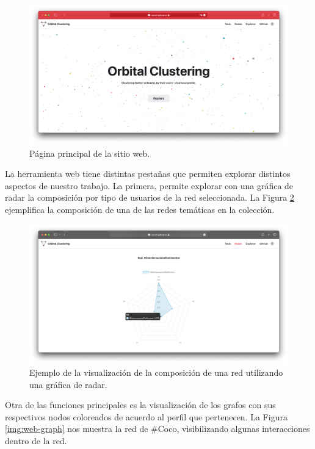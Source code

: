  \begin{figure}
   \centering
   \includegraphics[width=1\textwidth]{images/web-main.png}
    \caption{Página principal de la sitio web.}
    \label{img:web-main}
\end{figure}

La herramienta web tiene distintas pestañas que permiten explorar distintos aspectos de nuestro trabajo. La primera, permite explorar con una gráfica de radar la composición por tipo de usuarios de la red seleccionada. La Figura \ref{img:web-comp} ejemplifica la composición de una de las redes temáticas en la colección.

 \begin{figure}
   \centering
   \includegraphics[width=1\textwidth]{images/web-comp.png}
    \caption{Ejemplo de la visualización de la composición de una red utilizando una gráfica de radar.}
    \label{img:web-comp}
\end{figure}

Otra de las funciones principales es la visualización de los grafos con sus respectivos nodos coloreados de acuerdo al perfil que pertenecen. La Figura \ref{img:web-graph} nos muestra la red de \#Coco, visibilizando algunas interacciones dentro de la red.


